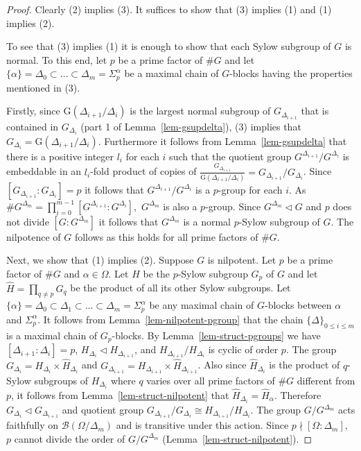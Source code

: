 \documentclass{llncs}
\newcommand{\Blocks}[1]{{\ensuremath{\mathcal{B}\left(#1\right)}}}
\newcommand{\Gof}[1]{{\ensuremath{\mathrm{G}\left(#1\right)}}}
\begin{document}
\begin{proof}
Clearly (2) implies (3). It suffices to show that (3) implies (1)
and (1) implies (2).

To see that (3) implies (1) it is enough to show that each Sylow
subgroup of $G$ is normal. To this end, let $p$ be a prime factor of
$\# G$ and let $\{ \alpha \} = \Delta_0 \subset \ldots \subset
\Delta_m = \Sigma_p^\alpha$ be a maximal chain of $G$-blocks having
the properties mentioned in (3). 

Firstly, since $\Gof{\Delta_{i+1}/\Delta_i}$ is the largest normal
subgroup of $G_{\Delta_{i+1}}$ that is contained in $G_{\Delta_i}$
(part 1 of Lemma~\ref{lem-gsupdelta}), (3) implies that $G_{\Delta_i}
= \Gof{\Delta_{i+1}/\Delta_i}$. Furthermore it follows from
Lemma~\ref{lem-gsupdelta} that there is a positive integer $l_i$ for
each $i$ such that the quotient group $G^{\Delta_{i+1}}/G^{\Delta_i}$
is embeddable in an $l_i$-fold product of copies of
$\frac{G_{\Delta_{i+1}}}{\Gof{\Delta_{i+1}/\Delta_i}} =
G_{\Delta_{i+1}}/G_{\Delta_i}$.  Since
$[G_{\Delta_{i+1}}:G_{\Delta_i}]=p$ it follows that
$G^{\Delta_{i+1}}/G^{\Delta_i}$ is a $p$-group for each $i$.  As $ \#
G^{\Delta_m}=\prod_{i=0}^{m-1} [G^{\Delta_{i+1}}:G^{\Delta_i}], $
$G^{\Delta_m}$ is also a $p$-group. Since $G^{\Delta_m}\lhd G$ and $p$
does not divide $[G:G^{\Delta_m}]$ it follows that $G^{\Delta_m}$ is a
normal $p$-Sylow subgroup of $G$. The nilpotence of $G$ follows as
this holds for all prime factors of $\# G$.

Next, we show that (1) implies (2). Suppose $G$ is nilpotent. Let $p$
be a prime factor of $\# G$ and $\alpha\in\Omega$. Let $H$ be the
$p$-Sylow subgroup $G_p$ of $G$ and let $\widehat{H}= \prod_{q \neq
p}G_q$ be the product of all its other Sylow subgroups. Let
$\{\alpha\}=\Delta_0\subset\Delta_1\subset\ldots\subset
\Delta_m=\Sigma_p^\alpha$ be any maximal chain of $G$-blocks between
$\alpha$ and $\Sigma_p^\alpha$. It follows from
Lemma~\ref{lem-nilpotent-pgroup} that the chain $\{ \Delta \}_{0 \leq
i \leq m}$ is a maximal chain of $G_p$-blocks.  By
Lemma~\ref{lem-struct-pgroups} we have $[\Delta_{i+1}:\Delta_i]=p$,
$H_{\Delta_i}\lhd H_{\Delta_{i+1}}$, and
$H_{\Delta_{i+1}}/H_{\Delta_i}$ is cyclic of order $p$.  The group
$G_{\Delta_i}=H_{\Delta_i}\times\widehat{H}_{\Delta_i}$ and
$G_{\Delta_{i+1}}=H_{\Delta_{i+1}}\times\widehat{H}_{\Delta_{i+1}}$.
Also since $\widehat{H}_{\Delta_i}$ is the product of $q$-Sylow
subgroups of $H_{\Delta_i}$ where $q$ varies over all prime factors of
$\# G$ different from $p$, it follows from
Lemma~\ref{lem-struct-nilpotent} that $\widehat{H}_{\Delta_i} =
\widehat{H}_\alpha$.  Therefore $G_{\Delta_i}\lhd G_{\Delta_{i+1}}$
and quotient group $G_{\Delta_{i+1}}/G_{\Delta_i} \cong
H_{\Delta_{i+1}}/H_{\Delta_i}$. The group $G/G^{\Delta_m}$ acts
faithfully on $\Blocks{\Omega/\Delta_m}$ and is transitive under this
action. Since $p \nmid [\Omega:\Delta_m]$, $p$ cannot divide the order
of $G/G^{\Delta_m}$ (Lemma~\ref{lem-struct-nilpotent}).
\end{proof}
\end{document}
